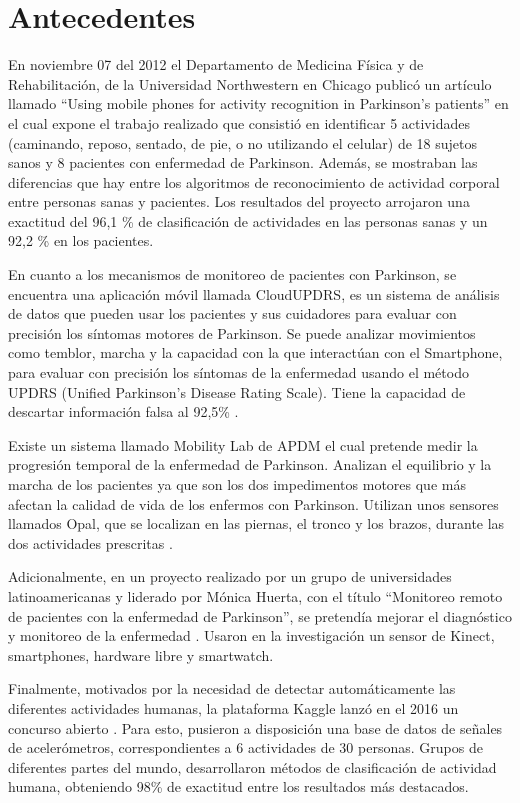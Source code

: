 \documentclass[11pt]{report}
\begin{document}
\section{Antecedentes}
En noviembre 07 del 2012 el Departamento de Medicina Física y de Rehabilitación, de la Universidad Northwestern
en Chicago publicó un artículo llamado “Using mobile phones for activity recognition in Parkinson’s patients” en
el cual expone el trabajo realizado que consistió en identificar 5 actividades (caminando, reposo, sentado, de pie,
o no utilizando el celular) de 18 sujetos sanos y 8 pacientes con enfermedad de Parkinson. Además, se mostraban
las diferencias que hay entre los algoritmos de reconocimiento de actividad corporal entre personas sanas y
pacientes. Los resultados del proyecto arrojaron una exactitud del 96,1 \% de clasificación de actividades en las
personas sanas y un 92,2 \% en los pacientes. 
\par
\medskip
\noindent
En cuanto a los mecanismos de monitoreo de pacientes con Parkinson, se encuentra una aplicación móvil llamada
CloudUPDRS, es un sistema de análisis de datos que pueden usar los pacientes y sus cuidadores para evaluar con
precisión los síntomas motores de Parkinson. Se puede analizar movimientos como temblor, marcha y la capacidad
con la que interactúan con el Smartphone, para evaluar con precisión los síntomas de la enfermedad usando el
método UPDRS (Unified Parkinson’s Disease Rating Scale). Tiene la capacidad de descartar información falsa al
92,5\% \cite{PacientesParkinson}.
\par
\medskip
\noindent
Existe un sistema llamado Mobility Lab de APDM el cual pretende medir la progresión temporal de la
enfermedad de Parkinson. Analizan el equilibrio y la marcha de los pacientes ya que son los dos impedimentos
motores que más afectan la calidad de vida de los enfermos con Parkinson. Utilizan unos sensores llamados Opal,
que se localizan en las piernas, el tronco y los brazos, durante las dos actividades prescritas \cite{MobilityLab}.
\par
\medskip
\noindent
Adicionalmente, en un proyecto realizado por un grupo de universidades latinoamericanas y liderado por Mónica
Huerta, con el título “Monitoreo remoto de pacientes con la enfermedad de Parkinson”, se pretendía mejorar el
diagnóstico y monitoreo de la enfermedad \cite{MonitoreoRemoto}. Usaron en la investigación un sensor de Kinect, smartphones,
hardware libre y smartwatch.
\par
\medskip
\noindent
Finalmente, motivados por la necesidad de detectar automáticamente las diferentes actividades humanas, la
plataforma Kaggle lanzó en el 2016 un concurso abierto \cite{Kaggle}. Para esto, pusieron a disposición una base de datos
de señales de acelerómetros, correspondientes a 6 actividades de 30 personas. Grupos de diferentes partes del
mundo, desarrollaron métodos de clasificación de actividad humana, obteniendo 98\% de exactitud entre los
resultados más destacados.
\end{document}
